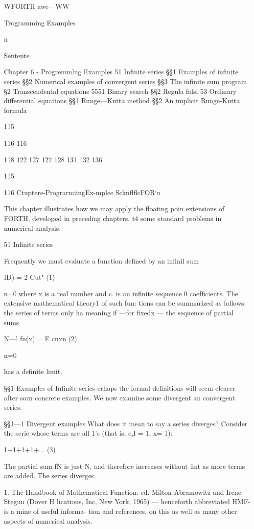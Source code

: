 WFORTH awe—WW

Trogramming Examples

n

Sentente

Chapter 6 - Progremmlng Examples
51 Inﬁnite series
§§1 Examples of inﬁnite series
§§2 Numerical examples of convergent series
§§3 The inﬁnite sum program
§2 Transcendental equations
5551 Binary search
§§2 Regula falsi
53 Ordinary differential equations
§§1 Runge—Kutta method
§§2 An implicit Runge-Kutta formula

115

116
116

118
122
127
127
128
131
132
136

115

116 Ctuptere-PrograrmiingEx-mplee ScknﬂﬂcFOR‘n

This chapter illustrates how we may apply the ﬂoating poin
extensions of FORTH, developed in preceding chapters, t4
some standard problems in numerical analysis.

51 Infinite series

Frequently we must evaluate a function deﬁned by an inﬁnil
sum

ID) = 2 Cut" (1)

n=0
where x is a real number and c. is an inﬁnite sequence 0
coefﬁcients. The extensive mathematical theory1 of such fun:
tions can be summarized as follows: the series of terms only ha
meaning if —for ﬁxedx — the sequence of partial sums

N—l
fn(x) = E cnxn (2)

n=0

has a definite limit.

§§1 Examples of Inﬁnite series
erhaps the formal deﬁnitions will seem clearer after sorn
concrete examples. We now examine some divergent an
convergent series.

§§1—1 Divergent examples
What does it mean to say a series diverges? Consider the seric
whose terms are all 1's (that is, c,I = 1, x= 1):

1+1+1+1+... (3)

The partial sum fN is just N, and therefore increases without lint
as more terms are added. The series diverges.

 

1. The Handbook of Mathematical Function: ed. Milton Abramowitz and Irene Stegun (Dover H
lications, Inc, New York, 1965) — henceforth abbreviated HMF- is a mine of useful informa-
tion and references, on this as well as many other aspects of numerical analysis.

